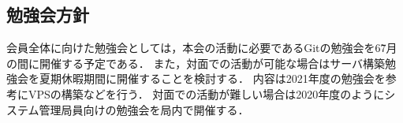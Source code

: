 \subsection*{勉強会方針}



会員全体に向けた勉強会としては，本会の活動に必要であるGitの勉強会を6\~7月の間に開催する予定である．
また，対面での活動が可能な場合はサーバ構築勉強会を夏期休暇期間に開催することを検討する．
内容は2021年度の勉強会を参考にVPSの構築などを行う．
対面での活動が難しい場合は2020年度のようにシステム管理局員向けの勉強会を局内で開催する．

